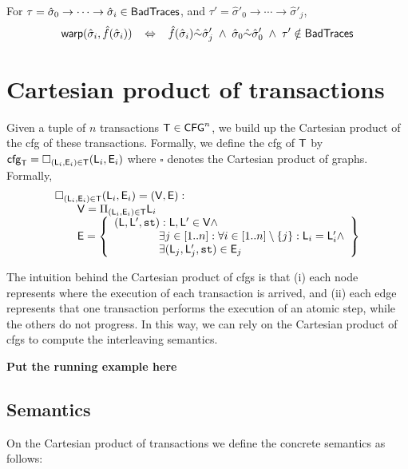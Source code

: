 For $\tau = \hat{\sigma}_0 \to \cdots \to \hat{\sigma}_i \in \mathsf{BadTraces}$, 
and $\tau' = \hat{\sigma}'_0 \to \cdots \to \hat{\sigma}'_j$,
$$
\textsf{warp}(\hat{\sigma}_i,\hat{f}(\hat{\sigma}_i))
\;\;\;\Leftrightarrow\;\;\;
\hat{f}(\hat{\sigma}_i) \hat{\sim} \hat{\sigma}_j'
\;\wedge\;
\hat{\sigma}_0 \hat{\sim} \hat{\sigma}'_0
\;\wedge\;
\tau' \notin \mathsf{BadTraces}
$$




\section{Cartesian product of transactions}
Given a tuple of $n$ transactions $\mathsf{T} \in \mathsf{CFG}^n$, we build up the Cartesian product of the cfg of these transactions. Formally, we define the cfg of $\mathsf{T}$ by $\mathsf{cfg}_{\mathsf{T}} = \square_{(\mathsf{L}_i, \mathsf{E}_{i}) \in \mathsf{T}} (\mathsf{L}_i, \mathsf{E}_{i})$ where $\square$ denotes the Cartesian product of graphs. Formally,
\[
\begin{array}{l}
\square_{(\mathsf{L}_i, \mathsf{E}_{i}) \in \mathsf{T}} (\mathsf{L}_i, \mathsf{E}_{i}) = (\mathsf{V}, \mathsf{E}) :\\
\hspace{20pt} \mathsf{V}=\Pi_{(\mathsf{L}_i, \mathsf{E}_{i}) \in \mathsf{T}} \mathsf{L}_i\\
\hspace{20pt} \mathsf{E}=
\left\{
\begin{array}{l}
(\mathsf{L}, \mathsf{L}', \mathtt{st}) : \mathsf{L}, \mathsf{L}' \in \mathsf{V} \land\\
\hspace{40pt} \exists j \in [1..n] : \forall i \in [1..n] \setminus \{j\}  : \mathsf{L}_i=\mathsf{L}'_i \land\\
\hspace{40pt} \exists (\mathsf{L}_j, \mathsf{L}'_j, \mathtt{st}) \in \mathsf{E}_j\\
\end{array}
\right\}
\end{array}
\]

The intuition behind the Cartesian product of cfgs is that (i) each node represents where the execution of each transaction is arrived, and (ii) each edge represents that one transaction performs the execution of an atomic step, while the others do not progress. In this way, we can rely on the Cartesian product of cfgs to compute the interleaving semantics.

\textbf{Put the running example here}

\subsection{Semantics}
On the Cartesian product of transactions we define the concrete semantics as follows:

